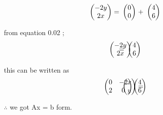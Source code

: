 \documentclass[journal,12pt,twocolumn]{IEEEtran}
\theoremstyle{remark}
\newcommand{\myvec}[1]{\ensuremath{\begin{pmatrix}#1\end{pmatrix}}}
\numberwithin{equation}{subsection}
\begin{document}
       \begin{align}
&\ \myvec{-2y\\2x }& \hspace{-0.25cm} =
&\ \myvec{0\\0} & \hspace{-0.25cm}+ 
&\ \myvec{4\\6} &
\end{align} 

      \vspace{1cm}
       from equation 0.02 ;
     \begin{align}
&\ \myvec{-2y\\2x }& \hspace{-1cm} =
&\ \myvec{4\\6} & 
\end{align} 

\vspace{1cm}
      this can be written as 
   \begin{align}
&\ \myvec{0 & -2\\2 & 0}& \hspace{-1cm}
\ \myvec{x\\y}&  = \hspace{-1cm}
&\ \myvec{4\\6} & 
\end{align} 

       \vspace{1cm}
     $\therefore$ we got Ax = b form.  
\end{document}
